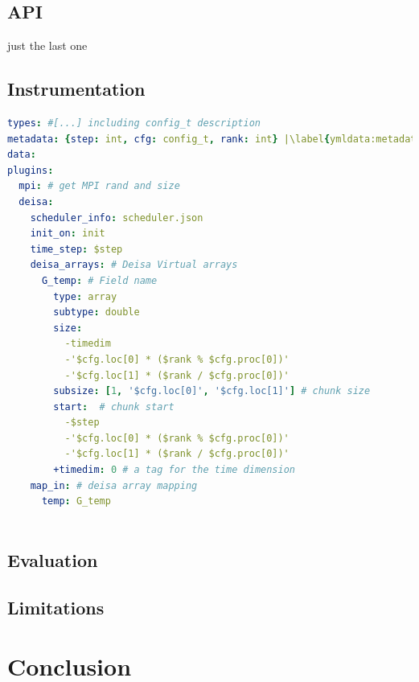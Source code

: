 \subsection{API}
just the last one 
\subsection{Instrumentation}
\begin{lstlisting}[float, label=ymldata, language=yaml, caption=Data description in \pdi \deisa YAML file]
types: #[...] including config_t description
metadata: {step: int, cfg: config_t, rank: int} |\label{ymldata:metadata}|
data: 
plugins:
  mpi: # get MPI rand and size
  deisa:
    scheduler_info: scheduler.json
    init_on: init 
    time_step: $step 
    deisa_arrays: # Deisa Virtual arrays
      G_temp: # Field name
        type: array
        subtype: double
        size:
          -timedim 
          -'$cfg.loc[0] * ($rank % $cfg.proc[0])'
          -'$cfg.loc[1] * ($rank / $cfg.proc[0])'
        subsize: [1, '$cfg.loc[0]', '$cfg.loc[1]'] # chunk size
        start:  # chunk start
          -$step
          -'$cfg.loc[0] * ($rank % $cfg.proc[0])'
          -'$cfg.loc[1] * ($rank / $cfg.proc[0])'
        +timedim: 0 # a tag for the time dimension
    map_in: # deisa array mapping
      temp: G_temp
        
\end{lstlisting}
\subsection{Evaluation}
\subsection{Limitations}

\section{Conclusion}